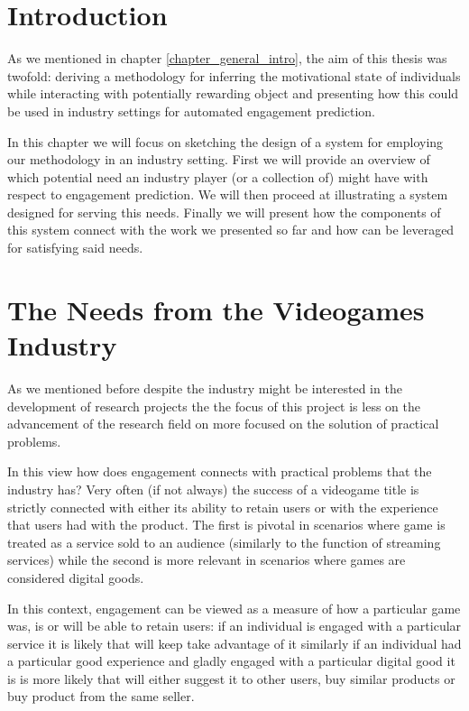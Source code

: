 \section{Introduction}
\label{industry_needs}
As we mentioned in chapter \ref{chapter_general_intro}, the aim of this thesis was twofold: deriving a methodology for inferring the motivational state of individuals while interacting with potentially rewarding object and presenting how this could be used in industry settings for automated engagement prediction.

In this chapter we will focus on sketching the design of a system for employing our methodology in an industry setting. First we will provide an overview of which potential need an industry player (or a collection of) might have with respect to engagement prediction. We will then proceed at illustrating a system designed for serving this needs. Finally we will present how the components of this system connect with the work we presented so far and how can be leveraged for satisfying said needs.

\section{The Needs from the Videogames Industry}
\label{industry_needs}
As we mentioned before despite the industry might be interested in the development of research projects the the focus of this project is less on the advancement of the research field on more focused on the solution of practical problems. 

In this view how does engagement connects with practical problems that the industry has? Very often (if not always) the success of a videogame title is strictly connected with either its ability to retain users or with the experience that users had with the product. The first is pivotal in scenarios where game is treated as a service sold to an audience (similarly to the function of streaming services) while the second is more relevant in scenarios where games are considered digital goods. 

In this context, engagement can be viewed as a measure of how a particular game was, is or will be able to retain users: if an individual is engaged with a particular service it is likely that will keep take advantage of it similarly if an individual had a particular good experience and gladly engaged with a particular digital good it is is more likely that will either suggest it to other users, buy similar products or buy product from the same seller.  

